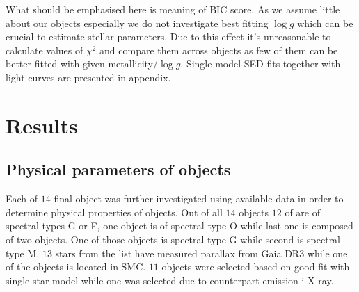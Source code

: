 \documentclass{pracalicmgr}
\begin{document}
What should be emphasised here is meaning of BIC score. As we assume little about our objects especially we do not investigate best fitting 
$\log{g}$ which can be crucial to estimate stellar parameters. Due to this effect it's unreasonable to calculate values of $\chi^2$ and compare them 
across objects as few of them can be better fitted with given metallicity/$\log{g}$.
Single model SED fits together with light curves are presented in appendix.
\chapter{Results}
\section{Physical parameters of objects}
Each of $14$ final object was further investigated using available data in order to determine physical properties of objects.
Out of all $14$ objects $12$ of are of spectral types G or F, one object is of spectral type O while last one is composed of two objects. One of those objects is spectral type G while 
second is spectral type M. $13$ stars from the list have measured parallax from Gaia DR3 while one of the objects is located in SMC.
$11$ objects were selected based on good fit with single star model while one was selected due to counterpart emission i X-ray.
\end{document}
